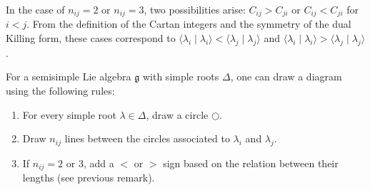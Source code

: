     \begin{remark}
        In the case of $n_{ij} = 2$ or $n_{ij} = 3$, two possibilities arise: $C_{ij}>C_{ji}$ or $C_{ij}<C_{ji}$ for $i<j$. From the definition of the Cartan integers and the symmetry of the dual Killing form, these cases correspond to $\langle\lambda_i\mid\lambda_i\rangle<\langle\lambda_j\mid\lambda_j\rangle$ and $\langle\lambda_i\mid\lambda_i\rangle>\langle\lambda_j\mid\lambda_j\rangle$.
    \end{remark}

    \begin{construct}\label{lie:construct_dynkin}
        For a semisimple Lie algebra $\mathfrak{g}$ with simple roots $\Delta$, one can draw a diagram using the following rules:
        \begin{enumerate}
            \item For every simple root $\lambda\in\Delta$, draw a circle $\bigcirc$.
            \item Draw $n_{ij}$ lines between the circles associated to $\lambda_i$ and $\lambda_j$.
            \item If $n_{ij}=2$ or 3, add a $<$ or $>$ sign based on the relation between their lengths (see previous remark).
        \end{enumerate}
    \end{construct}

